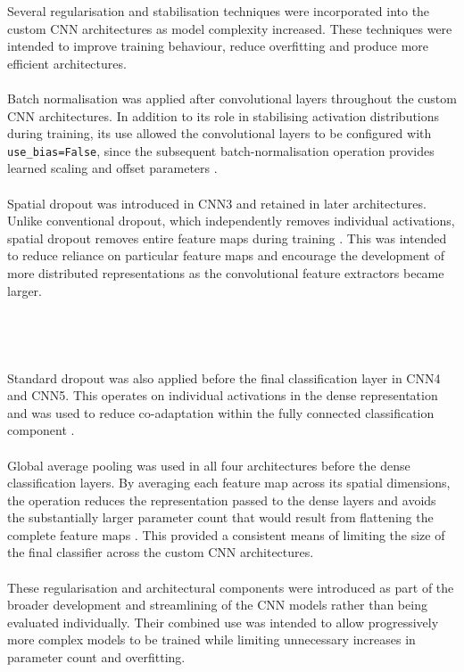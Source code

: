 \documentclass[12pt, a4paper]{report}
\begin{document}
				Several regularisation and stabilisation techniques were incorporated into the custom CNN architectures as model complexity increased. These techniques were intended to improve training behaviour, reduce overfitting and produce more efficient architectures.\\\\
				Batch normalisation was applied after convolutional layers throughout the custom CNN architectures. In addition to its role in stabilising activation distributions during training, its use allowed the convolutional layers to be configured with \texttt{use\_bias=False}, since the subsequent batch-normalisation operation provides learned scaling and offset parameters \cite{ioffe2015batch}.\\\\
				Spatial dropout was introduced in CNN3 and retained in later architectures. Unlike conventional dropout, which independently removes individual activations, spatial dropout removes entire feature maps during training \cite{tompson2015efficient}. This was intended to reduce reliance on particular feature maps and encourage the development of more distributed representations as the convolutional feature extractors became larger.\\\\\\\\\\
				Standard dropout was also applied before the final classification layer in CNN4 and CNN5. This operates on individual activations in the dense representation and was used to reduce co-adaptation within the fully connected classification component \cite{srivastava2014dropout}.\\\\
				Global average pooling was used in all four architectures before the dense classification layers. By averaging each feature map across its spatial dimensions, the operation reduces the representation passed to the dense layers and avoids the substantially larger parameter count that would result from flattening the complete feature maps \cite{lin2014network}. This provided a consistent means of limiting the size of the final classifier across the custom CNN architectures.\\\\
				These regularisation and architectural components were introduced as part of the broader development and streamlining of the CNN models rather than being evaluated individually. Their combined use was intended to allow progressively more complex models to be trained while limiting unnecessary increases in parameter count and overfitting.
				
\end{document}
